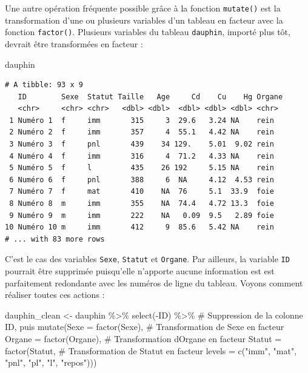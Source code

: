 \documentclass[
  letterpaper,
  DIV=11,
  numbers=noendperiod]{scrreprt}
\newenvironment{Shaded}{\begin{snugshade}}{\end{snugshade}}
\newcommand{\AttributeTok}[1]{\textcolor[rgb]{0.40,0.45,0.13}{#1}}
\newcommand{\CommentTok}[1]{\textcolor[rgb]{0.37,0.37,0.37}{#1}}
\newcommand{\FunctionTok}[1]{\textcolor[rgb]{0.28,0.35,0.67}{#1}}
\newcommand{\NormalTok}[1]{\textcolor[rgb]{0.00,0.23,0.31}{#1}}
\newcommand{\OtherTok}[1]{\textcolor[rgb]{0.00,0.23,0.31}{#1}}
\newcommand{\SpecialCharTok}[1]{\textcolor[rgb]{0.37,0.37,0.37}{#1}}
\newcommand{\StringTok}[1]{\textcolor[rgb]{0.13,0.47,0.30}{#1}}
\begin{document}
Une autre opération fréquente possible grâce à la fonction
\texttt{mutate()} est la transformation d'une ou plusieurs variables
d'un tableau en facteur avec la fonction \texttt{factor()}. Plusieurs
variables du tableau \texttt{dauphin}, importé plus tôt, devrait être
transformées en facteur :

\begin{Shaded}
\begin{Highlighting}[]
\NormalTok{dauphin}
\end{Highlighting}
\end{Shaded}

\begin{verbatim}
# A tibble: 93 x 9
   ID        Sexe  Statut Taille   Age     Cd    Cu    Hg Organe
   <chr>     <chr> <chr>   <dbl> <dbl>  <dbl> <dbl> <dbl> <chr> 
 1 Numéro 1  f     imm       315     3  29.6   3.24 NA    rein  
 2 Numéro 2  f     imm       357     4  55.1   4.42 NA    rein  
 3 Numéro 3  f     pnl       439    34 129.    5.01  9.02 rein  
 4 Numéro 4  f     imm       316     4  71.2   4.33 NA    rein  
 5 Numéro 5  f     l         435    26 192     5.15 NA    rein  
 6 Numéro 6  f     pnl       388     6  NA     4.12  4.53 rein  
 7 Numéro 7  f     mat       410    NA  76     5.1  33.9  foie  
 8 Numéro 8  m     imm       355    NA  74.4   4.72 13.3  foie  
 9 Numéro 9  m     imm       222    NA   0.09  9.5   2.89 foie  
10 Numéro 10 m     imm       412     9  85.6   5.42 NA    rein  
# ... with 83 more rows
\end{verbatim}

C'est le cas des variables \texttt{Sexe}, \texttt{Statut} et
\texttt{Organe}. Par ailleurs, la variable \texttt{ID} pourrait être
supprimée puisqu'elle n'apporte aucune information est est parfaitement
redondante avec les numéros de ligne du tableau. Voyons comment réaliser
toutes ces actions :

\begin{Shaded}
\begin{Highlighting}[]
\NormalTok{dauphin\_clean }\OtherTok{\textless{}{-}}\NormalTok{ dauphin }\SpecialCharTok{\%\textgreater{}\%} 
  \FunctionTok{select}\NormalTok{(}\SpecialCharTok{{-}}\NormalTok{ID) }\SpecialCharTok{\%\textgreater{}\%}                 \CommentTok{\# Suppression de la colonne ID, puis}
  \FunctionTok{mutate}\NormalTok{(}\AttributeTok{Sexe =} \FunctionTok{factor}\NormalTok{(Sexe),     }\CommentTok{\# Transformation de Sexe en facteur}
         \AttributeTok{Organe =} \FunctionTok{factor}\NormalTok{(Organe), }\CommentTok{\# Transformation d\textquotesingle{}Organe en facteur}
         \AttributeTok{Statut =} \FunctionTok{factor}\NormalTok{(Statut,  }\CommentTok{\# Transformation de Statut en facteur}
                         \AttributeTok{levels =} \FunctionTok{c}\NormalTok{(}\StringTok{"imm"}\NormalTok{, }\StringTok{"mat"}\NormalTok{, }\StringTok{"pnl"}\NormalTok{, }\StringTok{"pl"}\NormalTok{, }\StringTok{"l"}\NormalTok{, }\StringTok{"repos"}\NormalTok{)))}
\end{Highlighting}
\end{Shaded}
\end{document}
